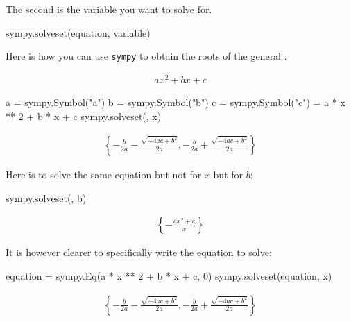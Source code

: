 The second is the variable you want to solve for.

\begin{api}
sympy.solveset(equation, variable)
\end{api}


Here is how you can use \texttt{sympy} to obtain the roots of the general :

\begin{equation*}
\begin{split}
a x ^ 2 + bx + c
\end{split}
\end{equation*}



\begin{pyin}
a = sympy.Symbol("a")
b = sympy.Symbol("b")
c = sympy.Symbol("c")
 = a * x ** 2 + b * x + c
sympy.solveset(, x)
\end{pyin}




\begin{equation*}
\begin{split}\displaystyle \left\{- \frac{b}{2 a} - \frac{\sqrt{- 4 a c + b^{2}}}{2 a}, - \frac{b}{2 a} + \frac{\sqrt{- 4 a c + b^{2}}}{2 a}\right\}\end{split}
\end{equation*}




Here is to solve the same equation but not for \(x\) but for
\(b\):




\begin{pyin}
sympy.solveset(, b)
\end{pyin}




\begin{equation*}
\begin{split}\displaystyle \left\{- \frac{a x^{2} + c}{x}\right\}\end{split}
\end{equation*}

It is however clearer to specifically write the equation to solve:

\begin{pyin}
equation = sympy.Eq(a * x ** 2 + b * x + c, 0)
sympy.solveset(equation, x)
\end{pyin}




\begin{equation*}
\begin{split}\displaystyle \left\{- \frac{b}{2 a} - \frac{\sqrt{- 4 a c + b^{2}}}{2 a}, - \frac{b}{2 a} + \frac{\sqrt{- 4 a c + b^{2}}}{2 a}\right\}\end{split}
\end{equation*}




